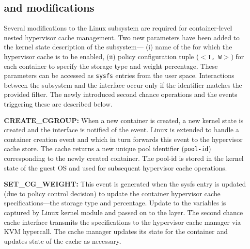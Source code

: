\subsection{\cgroup{} and \cleancache{} modifications}
%
Several modifications to the Linux \cgroups{} subsystem
are required for container-level nested hypervisor cache management.
%
Two new parameters have been added to the kernel
state description of the \cgroups{} subsystem---
(i) name of the \cgroups{} for
which the hypervisor cache is to be enabled, 
(ii) policy configuration tuple ($<$\texttt{T, W}$>$) for each container 
to specify 
the storage type and weight percentage.
%
These parameters can be accessed as \texttt{sysfs} entries 
from the user space.
%
Interactions between the \cgroup{} subsystem and the \cleancache{} interface
occur only if the \cgroup{} identifier matches the provided filter.
%
The newly introduced second chance operations and the events triggering these 
are described below.
%

\vspace{0.15cm}
\noindent
{\bf CREATE\_CGROUP:} When a new container is created, a new \cgroup{}
kernel state is created and
the \cleancache{} interface is notified of the event.
%
Linux \cleancache{} is extended to handle a container creation event and 
which in turn forwards this event to the \dd{} hypervisor cache store.
%
The \dd{} cache returns a new unique pool identifier (\texttt{pool-id}) 
corresponding to the newly created container. 
%
The pool-id is stored
in the \cgroup{} kernel state of the guest OS and used for subsequent
hypervisor cache operations.
%

\vspace{0.15cm}
\noindent
{\bf SET\_CG\_WEIGHT:} 
%
This event is generated when the \cgroup{} sysfs entry is updated 
(due to policy control decision) to update the container hypervisor
cache specifications---the storage type and  percentage.
%
Update to the \cgroup{} variables is captured by Linux 
kernel \cgroup{} module and passed on to the \cleancache{} layer. 
%
The \cleancache{} second chance cache interface transmits the specifications
to the \dd{} hypervisor cache manager via KVM hypercall. 
The \dd{} cache manager updates its state for the container
and updates state of the cache as necessary.
%
 
